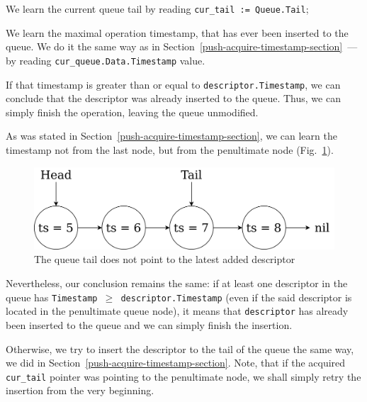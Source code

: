 \documentclass[times, dvipsnames,%
               languages={russian,english} %
              ]{itmo-student-thesis}
\begin{document}
\begin{nenum}
    \item We learn the current queue tail by reading \texttt{cur\_tail := Queue.Tail}; 
    
    \item We learn the maximal operation timestamp, that has ever been inserted to the queue. We do it the same way as in Section~\ref{push-acquire-timestamp-section}~--- by reading \texttt{cur\_queue.Data.Timestamp} value.
    
    \item If that timestamp is greater than or equal to \texttt{descriptor.Timestamp}, we can conclude that the descriptor was already inserted to the queue. Thus, we can simply finish the operation, leaving the queue unmodified. 
    
    As was stated in Section~\ref{push-acquire-timestamp-section}, we can learn the timestamp not from the last node, but from the penultimate node (Fig.~\ref{non-root-queue-stale-tail-pic}).
    
     \begin{figure}[H]
      \centering
      \caption{The queue tail does not point to the latest added descriptor}
      \label{non-root-queue-stale-tail-pic}
      \includegraphics[width=0.7\linewidth]{pics/root-queue-stale-tail.png}
    \end{figure}
    
    Nevertheless, our conclusion remains the same: if at least one descriptor in the queue has \texttt{Timestamp $\geq$ descriptor.Timestamp} (even if the said descriptor is located in the penultimate queue node), it means that \texttt{descriptor} has already been inserted to the queue and we can simply finish the insertion.
    
    \item Otherwise, we try to insert the descriptor to the tail of the queue the same way, we did in Section~\ref{push-acquire-timestamp-section}. Note, that if the acquired \texttt{cur\_tail} pointer was pointing to the penultimate node, we shall simply retry the insertion from the very beginning.
\end{nenum}

\bigbreak
\end{document}
